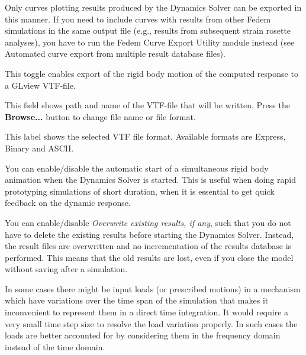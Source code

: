 Only curves plotting results produced by the Dynamics Solver can be exported
in this manner. If you need to include curves with results from other Fedem
simulations in the same output file (e.g., results from subsequent strain
rosette analyses), you have to run the Fedem Curve Export Utility module instead
(see 
                {Automated curve export from multiple result database files}).

\begin{bulletlist}
  \setcounter{enumi}{3}
\item
  This toggle enables export of the rigid body motion of the computed
  response to a GLview VTF-file.
\item
  This field shows path and name of the VTF-file that will be written.
  Press the \textbf{Browse...} button to change file name or file
  format.
\item
  This label shows the selected VTF file format. Available formats are
  Express, Binary and ASCII.
\item
  You can enable/disable the automatic start of a simultaneous rigid
  body animation when the Dynamics Solver is started. This is useful
  when doing rapid prototyping simulations of short duration, when it is
  essential to get quick feedback on the dynamic response.
\item
  You can enable/disable {\sl Overwrite existing results, if any},
  such that you do not have to delete the existing results before
  starting the Dynamics Solver. Instead, the result files are overwritten
  and no incrementation of the results database is performed.
  This means that the old results are lost, even if you close the model
  without saving after a simulation.
\end{bulletlist}




In some cases there might be input loads (or prescribed motions) in a
mechanism which have variations over the time span of the simulation
that makes it inconvenient to represent them in a direct time integration.
It would require a very small time step size to resolve the load variation
properly. In such cases the loads are better accounted for by considering them
in the frequency domain instead of the time domain.

